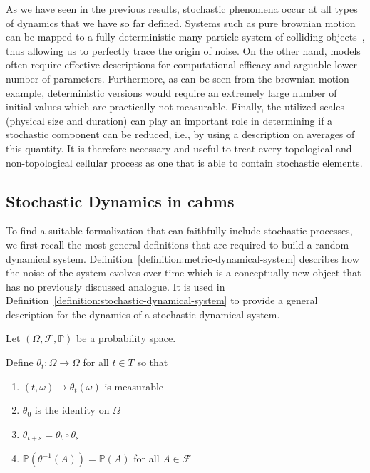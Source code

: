 As we have seen in the previous results, stochastic phenomena occur at all types of dynamics that we
have so far defined.
Systems such as pure brownian motion can be mapped to a fully deterministic many-particle system of
colliding objects~\cite{Einstein1905,vonSmoluchowski1906}, thus allowing us to perfectly trace the
origin of noise.
On the other hand, models often require effective descriptions for computational efficacy and
arguable lower number of parameters.
Furthermore, as can be seen from the brownian motion example, deterministic versions would require
an extremely large number of initial values which are practically not measurable.
Finally, the utilized scales (physical size and duration) can play an important role in determining
if a stochastic component can be reduced, i.e., by using a description on averages of this quantity.
It is therefore necessary and useful to treat every topological and non-topological cellular process
as one that is able to contain stochastic elements.

\subsection{Stochastic Dynamics in \aclp{cabm}}
To find a suitable formalization that can faithfully include stochastic processes, we first recall
the most general definitions that are required to build a random dynamical system.
Definition~\ref{definition:metric-dynamical-system} describes how the noise of the system evolves
over time which is a conceptually new object that has no previously discussed analogue.
It is used in Definition~\ref{definition:stochastic-dynamical-system} to provide a general
description for the dynamics of a stochastic dynamical system.

\begin{definition}
    Let $(\Omega,\mathcal{F},\mathbb{P})$ be a probability space.

    Define $\theta_t:\Omega\rightarrow\Omega$ for all $t\in T$ so that
    \begin{enumerate}
        \item $(t,\omega)\mapsto\theta_t(\omega)$ is measurable
        \item $\theta_0$ is the identity on $\Omega$
        \item $\theta_{t+s}=\theta_t\circ\theta_s$
        \item $\mathbb{P}(\theta^{-1}(A))=\mathbb{P}(A)$ for all $A\in\mathcal{F}$
            \label{definition:metric-dynamical-system-preserve-prob}
    \end{enumerate}
    \label{definition:metric-dynamical-system}
\end{definition}

